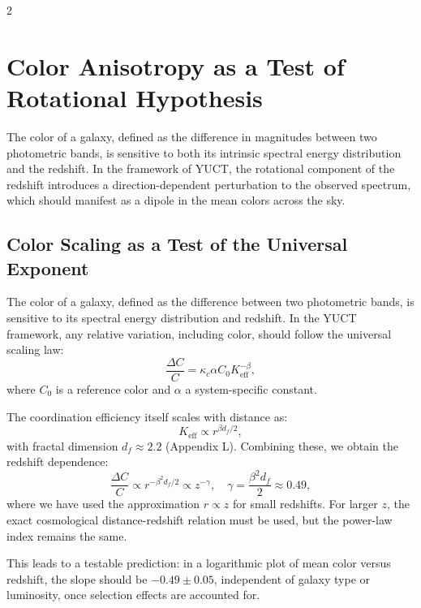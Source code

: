 \documentclass[12pt,a4paper]{article}
\begin{document}
\begin{multicols}{2}
		\section{Color Anisotropy as a Test of Rotational Hypothesis}
		
		The color of a galaxy, defined as the difference in magnitudes between two photometric bands, is sensitive to both its intrinsic spectral energy distribution and the redshift. In the framework of YUCT, the rotational component of the redshift introduces a direction-dependent perturbation to the observed spectrum, which should manifest as a dipole in the mean colors across the sky.
		
		\subsection{Color Scaling as a Test of the Universal Exponent}
		
		The color of a galaxy, defined as the difference between two photometric bands, is sensitive to its spectral energy distribution and redshift. In the YUCT framework, any relative variation, including color, should follow the universal scaling law:
		\begin{equation}
			\frac{\Delta C}{C} = \kappa_c \alpha C_0 K_{\mathrm{eff}}^{-\beta},
		\end{equation}
		where \(C_0\) is a reference color and \(\alpha\) a system-specific constant.
		
		The coordination efficiency itself scales with distance as:
		\begin{equation}
			K_{\mathrm{eff}} \propto r^{\beta d_f / 2},
		\end{equation}
		with fractal dimension \(d_f \approx 2.2\) (Appendix L). Combining these, we obtain the redshift dependence:
		\begin{equation}
			\frac{\Delta C}{C} \propto r^{-\beta^2 d_f / 2} \propto z^{-\gamma}, \quad \gamma = \frac{\beta^2 d_f}{2} \approx 0.49,
		\end{equation}
		where we have used the approximation \(r \propto z\) for small redshifts. For larger \(z\), the exact cosmological distance-redshift relation must be used, but the power-law index remains the same.
		
		This leads to a testable prediction: in a logarithmic plot of mean color versus redshift, the slope should be \(-0.49 \pm 0.05\), independent of galaxy type or luminosity, once selection effects are accounted for.
		

\end{multicols}
\end{document}
